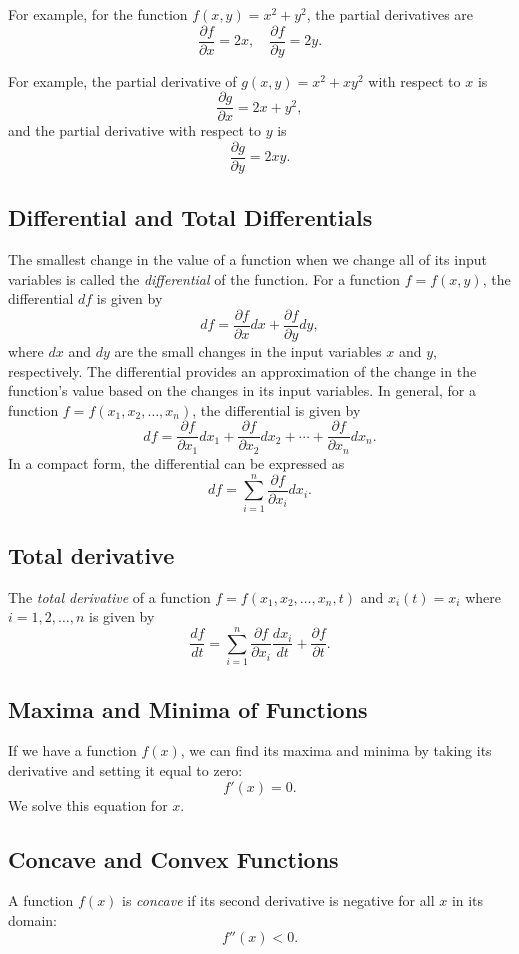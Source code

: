 \documentclass[12pt]{article}
\begin{document}
For example, for the function \(f(x,y)=x^2+y^2\), the partial derivatives are
\[
\frac{\partial f}{\partial x} = 2x, \quad
\frac{\partial f}{\partial y} = 2y.
\]

For example, the partial derivative of \(g(x,y)=x^2+xy^2\) with respect to \(x\) is
\[
\frac{\partial g}{\partial x} = 2x+y^2,
\]
and the partial derivative with respect to \(y\) is
\[
\frac{\partial g}{\partial y} = 2xy.    
\]

\subsection{Differential and Total Differentials}
The smallest change in the value of a function when we change all of its input variables is called the \emph{differential} of the function. For a function $f=f(x,y)$, the differential \(df\) is given by
\[
df = \frac{\partial f}{\partial x}dx + \frac{\partial f}{\partial y}dy,
\]
where \(dx\) and \(dy\) are the small changes in the input variables \(x\) and \(y\), respectively. The differential provides an approximation of the change in the function's value based on the changes in its input variables. In general, for a function \(f=f(x_1,x_2,\hdots,x_n)\), the differential is given by
\[
df = \frac{\partial f}{\partial x_1}dx_1 + \frac{\partial f}{\partial x_2}dx_2 + \cdots + \frac{\partial f}{\partial x_n}dx_n.
\]  
In a compact form, the differential can be expressed as
\[
df = \sum_{i=1}^{n} \frac{\partial f}{\partial x_i}dx_i.
\]

\subsection{Total derivative}

The \emph{total derivative} of a function $f=f(x_1,x_2,\ldots,x_n,t)$ and $x_i(t)=x_i$ where $i=1,2,\ldots,n$ is given by
\[
\frac{df}{dt} = \sum_{i=1}^{n} \frac{\partial f}{\partial x_i}\frac{dx_i}{dt} + \frac{\partial f}{\partial t}.
\]

\subsection{Maxima and Minima of Functions}
If we have a function $f(x)$, we can find its maxima and minima by taking its derivative and setting it equal to zero:
\[
f'(x) = 0.
\]
We solve this equation for $x$.

\subsection{Concave and Convex Functions}
A function \(f(x)\) is \emph{concave} if its second derivative is negative for all \(x\) in its domain:
\[
f''(x) < 0.
\]
\end{document}
